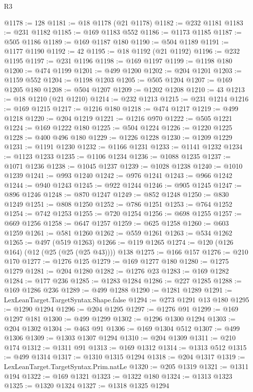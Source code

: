 \begin{lexlean}{R3}
\begin{coremodule}
@1178 := 128
@1181 := @18 @1178 (@21 @1178)
@1182 := @232 @1181
@1183 := @231 @1182
@1185 := @169 @1183 @552
@1186 := @1173 @1185
@1187 := @505 @1186
@1189 := @169 @1187 @180
@1190 := @504 @1189
@1191 := @1177 @1190
@1192 := 42
@1195 := @18 @1192 (@21 @1192)
@1196 := @232 @1195
@1197 := @231 @1196
@1198 := @169 @1197
@1199 := @1198 @180
@1200 := @474 @1199
@1201 := @499 @1200
@1202 := @204 @1201
@1203 := @1159 @552
@1204 := @1198 @1203
@1205 := @505 @1204
@1207 := @169 @1205 @180
@1208 := @504 @1207
@1209 := @1202 @1208
@1210 := 43
@1213 := @18 @1210 (@21 @1210)
@1214 := @232 @1213
@1215 := @231 @1214
@1216 := @169 @1215
@1217 := @1216 @180
@1218 := @474 @1217
@1219 := @499 @1218
@1220 := @204 @1219
@1221 := @1216 @970
@1222 := @505 @1221
@1224 := @169 @1222 @180
@1225 := @504 @1224
@1226 := @1220 @1225
@1228 := @400 @496 @180
@1229 := @1226 @1228
@1230 := @1209 @1229
@1231 := @1191 @1230
@1232 := @1166 @1231
@1233 := @1141 @1232
@1234 := @1123 @1233
@1235 := @1106 @1234
@1236 := @1088 @1235
@1237 := @1071 @1236
@1238 := @1045 @1237
@1239 := @1028 @1238
@1240 := @1010 @1239
@1241 := @993 @1240
@1242 := @976 @1241
@1243 := @966 @1242
@1244 := @940 @1243
@1245 := @922 @1244
@1246 := @905 @1245
@1247 := @896 @1246
@1248 := @870 @1247
@1249 := @852 @1248
@1250 := @830 @1249
@1251 := @808 @1250
@1252 := @786 @1251
@1253 := @764 @1252
@1254 := @742 @1253
@1255 := @720 @1254
@1256 := @698 @1255
@1257 := @669 @1256
@1258 := @647 @1257
@1259 := @625 @1258
@1260 := @603 @1259
@1261 := @581 @1260
@1262 := @559 @1261
@1263 := @534 @1262
@1265 := @497 (@519 @1263)
@1266 := @119 @1265
@1274 := @120 (@126 @164) (@12 (@25 (@25 (@25 @43)))) @138
@1275 := @166 @157
@1276 := @210 @170
@1277 := @1276 @125
@1279 := @169 @1277 @180
@1280 := @1275 @1279
@1281 := @204 @1280
@1282 := @1276 @23
@1283 := @169 @1282
@1284 := @177 @236
@1285 := @1283 @1284
@1286 := @227 @1285
@1288 := @169 @1286 @236
@1289 := @499 @1288
@1290 := @1281 @1289
@1291 := LexLeanTarget.TargetSyntax.Shape.false
@1294 := @273 @1291 @13 @180
@1295 := @1290 @1294
@1296 := @204 @1295
@1297 := @1276 @91
@1299 := @169 @1297 @181
@1300 := @499 @1299
@1302 := @1296 @1300 @1294
@1303 := @204 @1302
@1304 := @463 @91
@1306 := @169 @1304 @512
@1307 := @499 @1306
@1309 := @1303 @1307 @1294
@1310 := @204 @1309
@1311 := @210 @174
@1312 := @1311 @91
@1313 := @169 @1312
@1314 := @1313 @512
@1315 := @499 @1314
@1317 := @1310 @1315 @1294
@1318 := @204 @1317
@1319 := LexLeanTarget.TargetSyntax.Prim.natLe
@1320 := @205 @1319
@1321 := @1311 @194
@1322 := @169 @1321
@1323 := @1322 @180
@1324 := @1313 @1323
@1325 := @1320 @1324
@1327 := @1318 @1325 @1294

\end{coremodule}
\end{lexlean}
